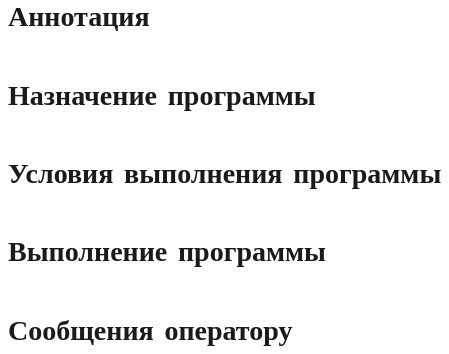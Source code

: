 \documentclass[11pt]{article}
\begin{document}
%
    

        

\newpage
{}    
\nointerlineskip\noindent%
\vspace*{-\topskip}%
\section{Аннотация}

\newpage
\tableofcontents

\newpage
\section{Назначение программы}

\newpage
\section{Условия выполнения программы}

\newpage
\section{Выполнение программы}

\newpage
\section{Сообщения оператору}
\end{document}

